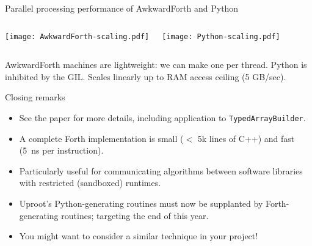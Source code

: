 \documentclass[aspectratio=169]{beamer}
\begin{document}
\begin{frame}{Parallel processing performance of AwkwardForth and Python}
\large
\vspace{0.2 cm}
\begin{columns}
\texttt{[image: AwkwardForth-scaling.pdf]}

\texttt{[image: Python-scaling.pdf]}
\end{columns}

AwkwardForth machines are lightweight: we can make one per thread. Python is inhibited by the GIL. Scales linearly up to RAM access ceiling (5 GB/sec).
\end{frame}

\begin{frame}{Closing remarks}
\Large
\vspace{0.25 cm}
\begin{itemize}[<+-|alert@+>]\setlength{\itemsep}{0.2 cm}
\item See the paper for more details, including application to \texttt{TypedArrayBuilder}.
\item A complete Forth implementation is small ($<$ 5k lines of C++) and fast (5~ns per instruction).
\item Particularly useful for communicating algorithms between software libraries with restricted (sandboxed) runtimes.
\item Uproot's Python-generating routines must now be supplanted by Forth-generating routines; targeting the end of this year.
\item You might want to consider a similar technique in your project!
\end{itemize}
\end{frame}
\end{document}
